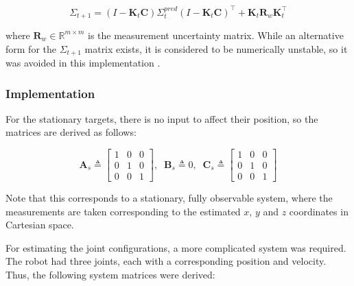 \begin{equation}
  \Sigma_{t+1} = (I - \mathbf{K}_{t} \mathbf{C}) \Sigma_t^{pred} (I - \mathbf{K}_{t}\mathbf{C})^{\intercal} + \mathbf{K}_{t} \mathbf{R}_{w} \mathbf{K}_{t}^{\intercal}
\end{equation}

\noindent where $\mathbf{R}_{w}\in\mathbb{R}^{m\times m}$ is the measurement uncertainty matrix.
While an alternative form for the $\Sigma_{t+1}$ matrix exists, it is considered to be numerically unstable, so it was avoided in this implementation \cite{bucy-joseph-filtering}.


\subsubsection*{Implementation}
For the stationary targets, there is no input to affect their position, so the matrices are derived as follows:

\[
 \mathbf{A}_{s} \triangleq
  \begin{bmatrix}
    1 & 0 & 0\\
    0 & 1 & 0\\
    0 & 0 & 1
  \end{bmatrix},\;\;
  \mathbf{B}_{s} \triangleq 0,\;\;
  \mathbf{C}_{s} \triangleq
  \begin{bmatrix}
    1 & 0 & 0\\
    0 & 1 & 0\\
    0 & 0 & 1
  \end{bmatrix}
\]

\noindent Note that this corresponds to a stationary, fully observable system, where the measurements are taken corresponding to the estimated $x$, $y$ and $z$ coordinates in Cartesian space.

For estimating the joint configurations, a more complicated system was required.
The robot had three joints, each with a corresponding position and velocity.
Thus, the following system matrices were derived:

